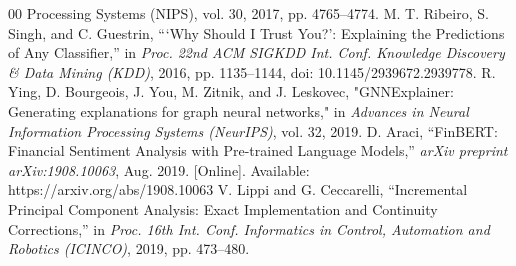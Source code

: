 \documentclass[conference]{IEEEtran}
\begin{document}
\begin{thebibliography}{00}
{    Processing Systems (NIPS)}, vol. 30, 2017, pp. 4765--4774.
    M. T. Ribeiro, S. Singh, and C. Guestrin, ```Why Should I Trust You?':
    Explaining the Predictions of Any Classifier,'' in
    \textit{Proc. 22nd ACM SIGKDD Int. Conf. Knowledge Discovery \&
    Data Mining (KDD)}, 2016, pp. 1135--1144,
    doi: 10.1145/2939672.2939778.
    R. Ying, D. Bourgeois, J. You, M. Zitnik, and J. Leskovec, "GNNExplainer: Generating explanations for graph neural networks," in \textit{Advances in Neural Information Processing Systems (NeurIPS)}, vol. 32, 2019.
    D. Araci, ``FinBERT: Financial Sentiment Analysis with Pre-trained
    Language Models,'' \textit{arXiv preprint arXiv:1908.10063}, Aug. 2019.
    [Online]. Available: https://arxiv.org/abs/1908.10063
    V. Lippi and G. Ceccarelli, ``Incremental Principal Component Analysis:
    Exact Implementation and Continuity Corrections,'' in \textit{Proc. 16th
    Int. Conf. Informatics in Control, Automation and Robotics (ICINCO)},
    2019, pp. 473--480.
    

\end{thebibliography}
\end{document}
